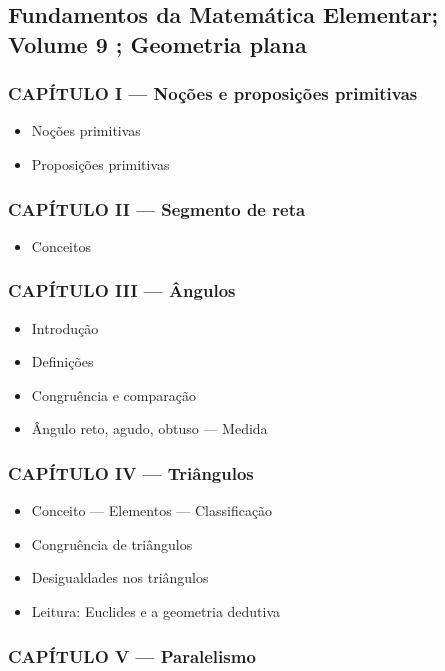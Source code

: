 \documentclass[a4paper,12pt]{article}[abntex2]
\begin{document}
 \subsection{Fundamentos da Matemática Elementar; Volume 9 ; Geometria plana}

\subsubsection*{CAPÍTULO I — Noções e proposições primitivas}

\begin{itemize}
\item Noções primitivas
\item Proposições primitivas
\end{itemize}
\subsubsection*{CAPÍTULO II — Segmento de reta}

\begin{itemize}
\item Conceitos
\end{itemize}
\subsubsection*{CAPÍTULO III — Ângulos}

\begin{itemize}
\item Introdução
\item Definições
\item Congruência e comparação
\item Ângulo reto, agudo, obtuso — Medida
\end{itemize}
\subsubsection*{CAPÍTULO IV — Triângulos}

\begin{itemize}
\item Conceito — Elementos — Classificação
\item Congruência de triângulos
\item Desigualdades nos triângulos
\item Leitura: Euclides e a geometria dedutiva
\end{itemize}
\subsubsection*{CAPÍTULO V — Paralelismo}
\end{document}
